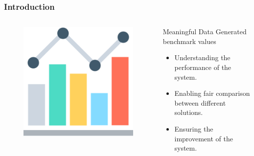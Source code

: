 \begin{frame}
    \frametitle{Introduction}
    \begin{columns}[T]
        \begin{column}{.48\textwidth}
            \begin{figure}[H]
                \includegraphics[width=\textwidth]{images/comparison.png}
                \label{fig:comparison}
            \end{figure}
        \end{column}
        \hfill
        \begin{column}{.48\textwidth}
            \begin{block}{Meaningful Data}
                Generated benchmark values
            \end{block}
            \begin{itemize}
                \item<2-> Understanding the performance of the system.
                \item<3-> Enabling fair comparison between different solutions.
                \item<4-> Ensuring the improvement of the system.
            \end{itemize}
        \end{column}
    \end{columns}
\end{frame}

